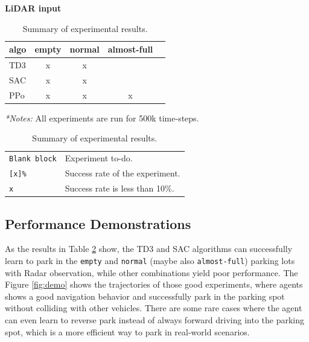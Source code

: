 \documentclass{article}
\begin{document}
\begin{table}[h]
  \begin{minipage}[t]{0.48\linewidth}
    \centering
    \textbf{LiDAR input}
    \vspace{0.5ex}
    \begin{tabular}{@{}lcccc@{}}
      \toprule
      algo & empty & normal & almost-full \\
      \midrule
      TD3  & x     & x      &             \\
      SAC  & x     & x      &             \\
      PPo  & x     & x      & x           \\
      \bottomrule
    \end{tabular}
  \end{minipage}
  \hfill
  \begin{minipage}[t]{0.48\linewidth}
    \small
    \textit{*Notes:} All experiments are run for 500k time-steps.
    \begin{tabularx}{\linewidth}{@{}lX@{}}
      \texttt{Blank block} & Experiment to-do.               \\
      \texttt{[x]\%}       & Success rate of the experiment. \\
      \texttt{x}           & Success rate is less than 10\%. \\
    \end{tabularx}
  \end{minipage}

  \vspace{1em}
  \caption{Summary of experimental results.}
  \label{tab:exp_status}
\end{table}

\subsection{Performance Demonstrations}

As the results in Table \ref{tab:exp_status} show, the TD3 and SAC algorithms can successfully learn to park in the \texttt{empty} and \texttt{normal} (maybe also \texttt{almost-full}) parking lots with Radar observation, while other combinations yield poor performance. The Figure \ref{fig:demo} shows the trajectories of those good experiments, where agents shows a good navigation behavior and successfully park in the parking spot without colliding with other vehicles. There are some rare cases where the agent can even learn to reverse park instead of always forward driving into the parking spot, which is a more efficient way to park in real-world scenarios.
\end{document}
